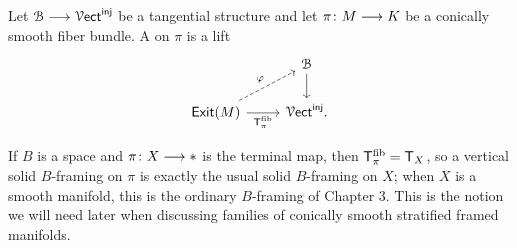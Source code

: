 \begin{definition}
    Let $\mathcal B \longrightarrow \operatorname{\mathcal V{\sf ect}}^{\operatorname{\mathsf{inj}}}$ be a tangential structure and let $\pi\colon M \longrightarrow K$ be a conically smooth fiber bundle. A  on $\pi$ is a lift
    \begin{equation}
    \begin{tikzcd}[ampersand replacement=\&]
        \& \cB \\
        {\exit(M)} \& {\Vect^{\inj}}.
        \arrow[from=1-2, to=2-2]
        \arrow["\varphi", dashed, from=2-1, to=1-2]
        \arrow["{\sT^{\mathrm{fib}}_{\pi}}"', from=2-1, to=2-2]
    \end{tikzcd}
    \end{equation}
\end{definition}

If $B$ is a space and $\pi\colon X \longrightarrow *$ is the terminal map, then $\mathsf T^{\mathrm{fib}}_{\pi}=\mathsf T_X$, so a vertical solid $B$-framing on $\pi$ is exactly the usual solid $B$-framing on $X$; when $X$ is a smooth manifold, this is the ordinary $B$-framing of Chapter 3. This is the notion we will need later when discussing families of conically smooth stratified framed manifolds.

